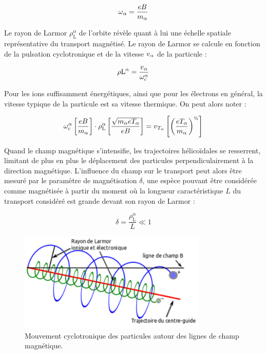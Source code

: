 \begin{refsection}
\begin{equation}
\omega{_{{\alpha}}}=\frac{e B}{m_\alpha}
\end{equation}

Le rayon de Larmor $\rho_\text{L}^\alpha$ de l'orbite révèle quant à lui une
échelle spatiale représentative du transport magnétisé. Le rayon de Larmor se
calcule en fonction de la pulsation cyclotronique et de la vitesse
$v{_{\alpha}}$ de la particule :

\begin{equation}
\rho\text{L}^\alpha
=\frac{v{_{\alpha}}}{\omega_c^{{\alpha}}}
\end{equation}

Pour les ions suffisamment énergétiques, ainsi que pour les électrons en général,
la vitesse typique de la particule est sa vitesse thermique. On peut alors noter :

\begin{equation}
\omega_c^{\alpha}\left[\frac{e B}{m_\alpha}\right]
\cdot\rho_\text{L}^{\alpha}\left[\frac{\sqrt{m_\alpha eT_\alpha}}{eB}\right]
=v\indice{T_{\alpha}}\left[\left(\frac{eT_{\alpha}}{m_{\alpha}}\right)^{\text{\textonehalf}}\right]
\end{equation}

Quand le champ magnétique s'intensifie, les trajectoires
hélicoïdales se resserrent, limitant de plus en plus le déplacement des
particules perpendiculairement à la direction magnétique. L'influence du champ
sur le transport peut alors être mesuré par le paramètre de
magnétisation $\delta$, une espèce pouvant être considérée comme magnétisée à
partir du moment où la longueur caractéristique $L$ du transport considéré est
grande devant son rayon de Larmor :

\begin{equation}
\delta=\frac{\rho_\text{L}^\alpha}{L}\ll 1
\end{equation}

\begin{figure}[htbp]
\centering
\includegraphics[width=0.8\textwidth]{figures/1-mouvementCyclotron.png}
{\caption{Mouvement cyclotronique des particules autour des lignes de champ
magnétique.}\label{1-particleDrifts}}
\end{figure}


\end{refsection}
